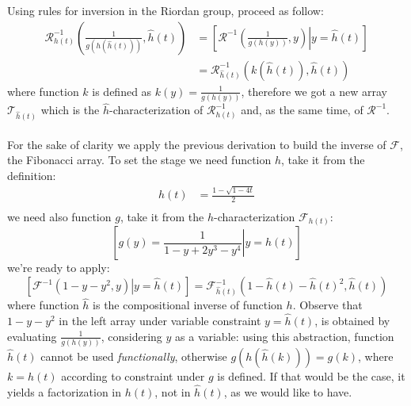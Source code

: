 Using rules for inversion in the Riordan group, 
proceed as follow:
\begin{displaymath}
    \begin{split}
        \mathcal{R}_{h(t)}^{-1}\left(\frac{1}{g(h(\hat{h}(t)))},\hat{h}(t)\right)&=
        \left[\mathcal{R}^{-1}\left(\left.\frac{1}{g(h(y))},y\right) \right| y = \hat{h}(t) \right]\\
        &= \mathcal{R}_{\hat{h}(t)}^{-1}\left(k(\hat{h}(t)),\hat{h}(t)\right)
    \end{split}
\end{displaymath}
where function $k$ is defined as $k(y)=\frac{1}{g(h(y))}$, 
therefore we got a new array $\mathcal{T}_{\hat{h}(t)}$ which is the $\hat{h}$-characterization
of $\mathcal{R}_{h(t)}^{-1}$ and, as the same time, of $\mathcal{R}^{-1}$.
\\\\
For the sake of clarity we apply the previous derivation to build the inverse of $\mathcal{F}$,
the Fibonacci array.  To set the stage we need function $h$, take it from the definition:
\begin{displaymath}
    \begin{split}
        h(t)&=\frac{1-\sqrt{1-4t}}{2}\\
    \end{split}
\end{displaymath}
we need also function $g$, take it from the $h$-characterization $\mathcal{F}_{h(t)}$:
\begin{displaymath}
    \left[g(y)=\left.\frac{1}{1-y+2y^3-y^4} \right| y=h(t)\right]
\end{displaymath}
we're ready to apply:
\begin{displaymath}
    \left[\mathcal{F}^{-1}\left.\left(1-y-y^2,y\right) \right| y = \hat{h}(t) \right]=
    \mathcal{F}_{\hat{h}(t)}^{-1}\left(1-\hat{h}(t)-\hat{h}(t)^2,\hat{h}(t)\right)
\end{displaymath}
where function $\hat{h}$ is the compositional inverse of function $h$. Observe
that $1-y-y^2$ in the left array under variable constraint $y=\hat{h}(t)$, is
obtained by evaluating $\frac{1}{g(h(y))}$, considering $y$ as a variable:
using this abstraction, function $\hat{h}(t)$ cannot be used
\emph{functionally}, otherwise $g(h(\hat{h}(k)))=g(k)$, where $k=h(t)$
according to constraint under $g$ is defined. If that would be the case, it
yields a factorization in $h(t)$, not in $\hat{h}(t)$, as we would like to
have.

